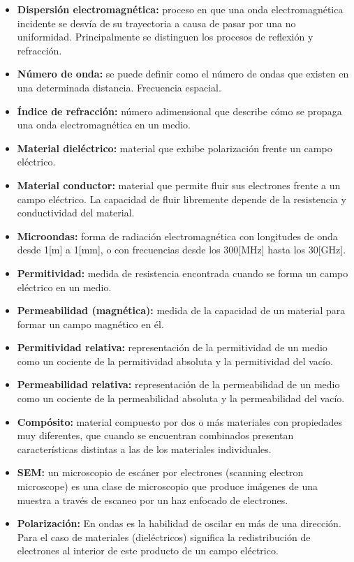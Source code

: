 \begin{itemize}
	\renewcommand\labelitemi{--}
	\item \textbf{Dispersión electromagnética:} proceso en que una onda electromagnética incidente se desvía de su trayectoria a causa de pasar por una no uniformidad. Principalmente se distinguen los procesos de reflexión y refracción. 
	\item \textbf{Número de onda:} se puede definir como el número de ondas que existen en una determinada distancia. Frecuencia espacial.
	\item \textbf{Índice de refracción:} número adimensional que describe cómo se propaga una onda electromagnética en un medio.
	\item \textbf{Material dieléctrico:} material que exhibe polarización frente un campo eléctrico. 
	\item \textbf{Material conductor:} material que permite fluir sus electrones frente a un campo eléctrico. La capacidad de fluir libremente depende de la resistencia y conductividad del material.
	\item \textbf{Microondas:} forma de radiación electromagnética con longitudes de onda desde 1[m] a 1[mm], o con frecuencias desde los 300[MHz] hasta los 30[GHz].
	\item \textbf{Permitividad:} medida de resistencia encontrada cuando se forma un campo eléctrico en un medio.
	\item \textbf{Permeabilidad (magnética):} medida de la capacidad de un material para formar un campo magnético en él.
	\item \textbf{Permitividad relativa:} representación de la permitividad de un medio como un cociente de la permitividad absoluta y la permitividad del vacío. 
	\item \textbf{Permeabilidad relativa:} representación de la permeabilidad de un medio como un cociente de la permeabilidad absoluta y la permeabilidad del vacío. 
	\item \textbf{Compósito:} material compuesto por dos o más materiales con propiedades muy diferentes, que cuando se encuentran combinados presentan características distintas a las de los materiales individuales.  
	\item \textbf{SEM:} un microscopio de escáner por electrones (scanning electron microscope) es una clase de microscopio que produce imágenes de una muestra a través de escaneo por un haz enfocado de electrones.
	\item \textbf{Polarización:} En ondas es la habilidad de oscilar en más de una dirección. Para el caso de materiales (dieléctricos) significa la redistribución de electrones al interior de este producto de un campo eléctrico.

\end{itemize}
